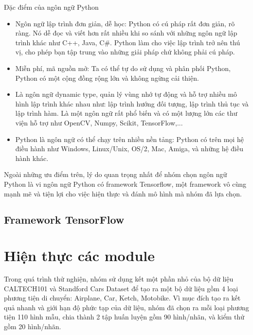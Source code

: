 \documentclass[a4paper,14pt]{extreport}
\begin{document}
Đặc điểm của ngôn ngữ Python

\begin{itemize}
        \item Ngôn ngữ lập trình đơn giản, dễ học: Python có cú pháp rất đơn giản, rõ ràng. Nó dễ đọc và viết hơn rất nhiều khi so sánh với những ngôn ngữ lập trình khác như C++, Java, C#. Python làm cho việc lập trình trở nên thú vị, cho phép bạn tập trung vào những giải pháp chứ không phải cú pháp.
        \item Miễn phí, mã nguồn mở: Ta có thể tự do sử dụng và phân phối Python, Python có một cộng đồng rộng lớn và không ngừng cải thiện.
        \item Là ngôn ngữ dynamic type, quản lý vùng nhớ tự động và hỗ trợ nhiều mô hình lập trình khác nhau như: lập trình hướng đối tượng, lập trình thủ tục và lập trình hàm. Là một ngôn ngữ rất phổ biến và có một lượng lớn các thư viện hỗ trợ như OpenCV, Numpy, Scikit, TensorFlow,...
        \item Python là ngôn ngữ có thể chạy trên nhiều nền tảng: Python có trên mọi hệ điều hành như Windows, Linux/Unix, OS/2, Mac, Amiga, và những hệ điều hành khác.
\end{itemize}

Ngoài những ưu điểm trên, lý do quan trọng nhất để nhóm chọn ngôn ngữ Python là vi ngôn ngữ Python có framework Tensorflow, một framework vô cùng mạnh mẽ và tiện lợi cho việc hiện thực và đánh mô hình mà nhóm đã lựa chọn.

\subsection{Framework TensorFlow}



\section{Hiện thực các module}
Trong quá trình thử nghiện, nhóm sử dụng kết một phần nhỏ của bộ dữ liệu CALTECH101 và Standford Cars Dataset để tạo ra một bộ dữ liệu gồm 4 loại phương tiện di chuyển: Airplane, Car, Ketch, Motobike. Vì mục đích tạo ra kết quả nhanh và giới hạn độ phức tạp của dữ liệu, nhóm đã chọn ra mỗi loại phương tiện 110 hình mẫu, chia thành 2 tập huấn luyện gồm 90 hình/nhãn, và kiểm thử gồm 20 hình/nhãn.
\end{document}
